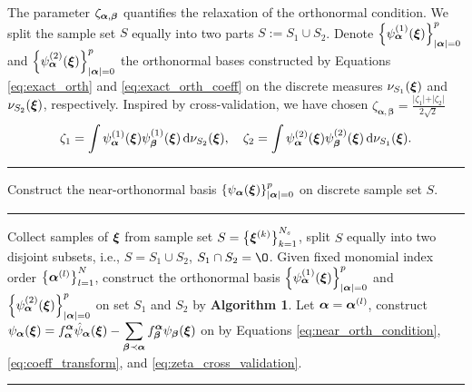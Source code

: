 The parameter $\zeta_{\bm\alpha,\bm\beta}$ quantifies the relaxation of the orthonormal condition. We split the sample set $S$ equally into two parts $S:=S_1\cup S_2$.
Denote $\left\{\psi^{\left(1\right)}_{\bm\alpha}(\bm\xi)\right\}_{\vert \bm\alpha \vert = 0}^{p}$ and $\left\{\psi^{\left(2\right)}_{\bm\alpha}(\bm\xi)\right\}_{\vert \bm\alpha \vert = 0}^{p}$ the orthonormal bases constructed by Equations \eqref{eq:exact_orth} and \eqref{eq:exact_orth_coeff} on the discrete measures $\nu_{S_1}(\bm\xi)$ and $\nu_{S_2}(\bm\xi)$, respectively. 
Inspired by cross-validation, we have chosen 
$\displaystyle \zeta_{\bm\alpha,\bm\beta} = \frac{\vert \zeta_1\vert + \vert \zeta_2\vert }{2\sqrt{2}}$%
\begin{equation}
  \zeta_1 = \int \psi^{(1)}_{\bm{\alpha}}(\bm{\xi}) \psi^{(1)}_{\bm{\beta}}(\bm{\xi}) \,\mathrm{d}\nu_{S_2}(\bm\xi),
  \quad
  \zeta_2 = \int \psi^{(2)}_{\bm{\alpha}}(\bm{\xi}) \psi^{(2)}_{\bm{\beta}}(\bm{\xi}) \,\mathrm{d} \nu_{S_1}(\bm\xi).
  \label{eq:zeta_cross_validation}
\end{equation}

\begin{algorithm}
  \hrule
  \caption{Construct the near-orthonormal  basis $\left\{ \psi_{\bm\alpha}(\bm\xi)\right\}_{\vert \bm\alpha \vert = 0}^p$ on discrete sample set $S$.}
  \vspace{5pt} \hrule \vspace{5pt}
  \begin{algorithmic}[1]
    \State Collect samples of $\bm\xi$ from sample set  $S = \left\{\bm\xi^{(k)}\right\}_{k = 1}^{N_s}$, split $S$ equally into two disjoint subsets, i.e., $S = S_1\cup S_2$, 
    $S_1 \cap S_2 = \O $. 
    \State Given fixed monomial index order $\left\{\bm\alpha^{(l)}\right\}_{l=1}^N$, construct the orthonormal  basis $\left\{\psi^{\left(1\right)}_{\bm\alpha}(\bm\xi)\right\}_{\vert \bm\alpha \vert = 0}^{p}$ and $\left\{\psi^{\left(2\right)}_{\bm\alpha}(\bm\xi)\right\}_{\vert \bm\alpha \vert = 0}^{p}$ on set $S_1$ and $S_2$ by \textbf{Algorithm 1}.
      \State Let $\bm\alpha = \bm\alpha^{(l)}$, construct $\displaystyle \psi_{\bm{\alpha}}(\bm\xi) = f_{\bm{\alpha}}^{\bm{\alpha}} \hat{\psi}_{\bm\alpha}(\bm\xi) - \mathop{\sum}_{\bm{\beta} \prec \bm{\alpha}} f_{\bm{\beta}}^{\bm{\alpha}} \psi_{\bm{\beta}}(\bm\xi)$ on by Equations \eqref{eq:near_orth_condition}, \eqref{eq:coeff_transform}, and \eqref{eq:zeta_cross_validation}.
    \ENDFOR   
  \end{algorithmic}
  \hrule
  \label{alg:near_orth_discrete}
\end{algorithm}

